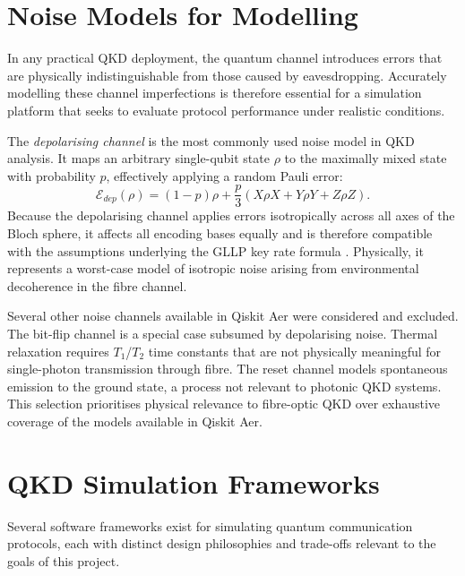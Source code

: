 \documentclass[10pt, a4paper]{report}
\begin{document}
\section{Noise Models for Modelling} 

In any practical QKD deployment, the quantum channel introduces errors that are physically indistinguishable from those caused by eavesdropping. Accurately modelling these channel imperfections is therefore essential for a simulation platform that seeks to evaluate protocol performance under realistic conditions.

The \textit{depolarising channel} is the most commonly used noise model in QKD analysis. It maps an arbitrary single-qubit state $\rho$ to the maximally mixed state with probability $p$, effectively applying a random Pauli error:
%
\begin{equation}
\label{eq:depolarising}
\mathcal{E}_{dep}(\rho) = (1-p)\rho + \frac{p}{3}(X\rho X + Y\rho Y + Z\rho Z).
\end{equation}
%
Because the depolarising channel applies errors isotropically across all axes of the Bloch sphere, it affects all encoding bases equally and is therefore compatible with the assumptions underlying the GLLP key rate formula \cite{GLLP2004}. Physically, it represents a worst-case model of isotropic noise arising from environmental decoherence in the fibre channel.


Several other noise channels available in Qiskit Aer were considered and excluded. The bit-flip channel is a special case subsumed by depolarising noise. Thermal relaxation requires $T_1$/$T_2$ time constants that are not physically meaningful for single-photon transmission through fibre. The reset channel models spontaneous emission to the ground state, a process not relevant to photonic QKD systems. This selection prioritises physical relevance to fibre-optic QKD over exhaustive coverage of the models available in Qiskit Aer.


\section{QKD Simulation Frameworks}

Several software frameworks exist for simulating quantum communication protocols, each with distinct design philosophies and trade-offs relevant to the goals of this project.
\end{document}
